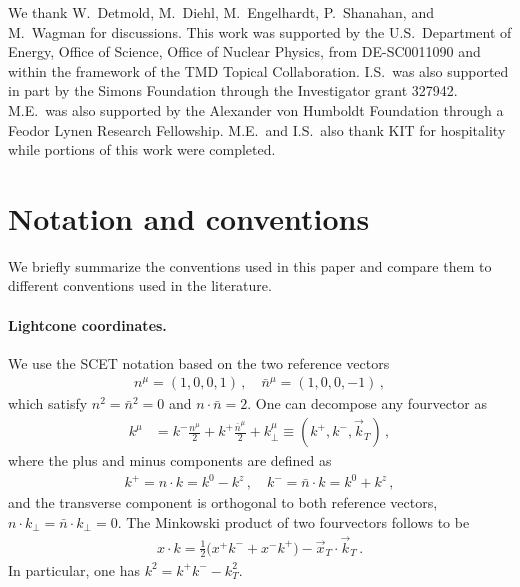 \documentclass[11pt,a4paper]{article}
\newcommand{\bn}{{\bar{n}}}
\newcommand{\kt}{\vec k_T}
\begin{document}
\begin{acknowledgments}
We thank W.~Detmold, M.~Diehl, M.~Engelhardt,  P.~Shanahan, and M.~Wagman for discussions.
This work was supported by the U.S.\ Department of Energy, Office of Science,
Office of Nuclear Physics, from DE-SC0011090
and within the framework of the TMD Topical Collaboration.
I.S.\ was also supported in part by the Simons Foundation through
the Investigator grant 327942.
M.E.\ was also supported by the Alexander von Humboldt Foundation
through a Feodor Lynen Research Fellowship.
M.E.\ and I.S.\ also thank KIT for hospitality while portions of this work were completed.

\end{acknowledgments}

\appendix

\section{Notation and conventions}
\label{app:conventions}

We briefly summarize the conventions used in this paper
and compare them to different conventions used in the literature.

\paragraph{Lightcone coordinates.}
We use the SCET notation based on the two reference vectors
\begin{align}
 n^\mu = (1,0,0,1) \,,\quad \bn^\mu = (1,0,0,-1)
\,,\end{align}
which satisfy $n^2 = \bn^2 = 0$ and $n \cdot \bn = 2$.
One can decompose any fourvector as
\begin{align}
 k^\mu &= k^- \frac{n^\mu}{2} + k^+ \frac{\bn^\mu}{2} + k_\perp^\mu
 \equiv (k^+, k^-, \kt)
\,,\end{align}
where the plus and minus components are defined as
\begin{align}
 k^+ = n \cdot k = k^0 - k^z \,,\quad k^- = \bn \cdot k = k^0 + k^z
\,,\end{align}
and the transverse component is orthogonal to both reference vectors, $n \cdot k_\perp = \bn \cdot k_\perp = 0$.
The Minkowski product of two fourvectors follows to be
\begin{align}
 x \cdot k = \frac{1}{2} \bigl(x^+ k^- + x^- k^+\bigr) - \vec{x}_T \cdot \kt
\,.\end{align}
In particular, one has $k^2 = k^+ k^- - k_T^2$.
\end{document}

